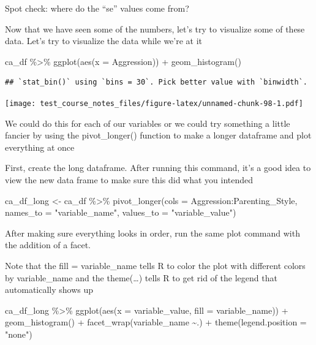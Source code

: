 \documentclass[
]{book}
\newenvironment{Shaded}{\begin{snugshade}}{\end{snugshade}}
\newcommand{\AttributeTok}[1]{\textcolor[rgb]{0.77,0.63,0.00}{#1}}
\newcommand{\FunctionTok}[1]{\textcolor[rgb]{0.00,0.00,0.00}{#1}}
\newcommand{\NormalTok}[1]{#1}
\newcommand{\OtherTok}[1]{\textcolor[rgb]{0.56,0.35,0.01}{#1}}
\newcommand{\SpecialCharTok}[1]{\textcolor[rgb]{0.00,0.00,0.00}{#1}}
\newcommand{\StringTok}[1]{\textcolor[rgb]{0.31,0.60,0.02}{#1}}
\begin{document}
Spot check: where do the ``se'' values come from?

Now that we have seen some of the numbers, let's try to visualize some of these data. Let's try to visualize the data while we're at it

\begin{Shaded}
\begin{Highlighting}[]
\NormalTok{ca\_df }\SpecialCharTok{\%\textgreater{}\%} 
  \FunctionTok{ggplot}\NormalTok{(}\FunctionTok{aes}\NormalTok{(}\AttributeTok{x =}\NormalTok{ Aggression)) }\SpecialCharTok{+}
  \FunctionTok{geom\_histogram}\NormalTok{()}
\end{Highlighting}
\end{Shaded}

\begin{verbatim}
## `stat_bin()` using `bins = 30`. Pick better value with `binwidth`.
\end{verbatim}

\texttt{[image: test\_course\_notes\_files/figure-latex/unnamed-chunk-98-1.pdf]}

We could do this for each of our variables or we could try something a little fancier by using the pivot\_longer() function to make a longer dataframe and plot everything at once

First, create the long dataframe. After running this command, it's a good idea to view the new data frame to make sure this did what you intended

\begin{Shaded}
\begin{Highlighting}[]
\NormalTok{ca\_df\_long }\OtherTok{\textless{}{-}}\NormalTok{ ca\_df }\SpecialCharTok{\%\textgreater{}\%} 
  \FunctionTok{pivot\_longer}\NormalTok{(}\AttributeTok{cols =}\NormalTok{ Aggression}\SpecialCharTok{:}\NormalTok{Parenting\_Style, }\AttributeTok{names\_to =} \StringTok{"variable\_name"}\NormalTok{, }\AttributeTok{values\_to =} \StringTok{"variable\_value"}\NormalTok{)}
\end{Highlighting}
\end{Shaded}

After making sure everything looks in order, run the same plot command with the addition of a facet.

Note that the fill = variable\_name tells R to color the plot with different colors by variable\_name and the theme(\ldots) tells R to get rid of the legend that automatically shows up

\begin{Shaded}
\begin{Highlighting}[]
\NormalTok{ca\_df\_long }\SpecialCharTok{\%\textgreater{}\%} 
  \FunctionTok{ggplot}\NormalTok{(}\FunctionTok{aes}\NormalTok{(}\AttributeTok{x =}\NormalTok{ variable\_value, }\AttributeTok{fill =}\NormalTok{ variable\_name)) }\SpecialCharTok{+}
  \FunctionTok{geom\_histogram}\NormalTok{() }\SpecialCharTok{+}
  \FunctionTok{facet\_wrap}\NormalTok{(variable\_name }\SpecialCharTok{\textasciitilde{}}\NormalTok{.) }\SpecialCharTok{+}
  \FunctionTok{theme}\NormalTok{(}\AttributeTok{legend.position =} \StringTok{"none"}\NormalTok{)}
\end{Highlighting}
\end{Shaded}
\end{document}
